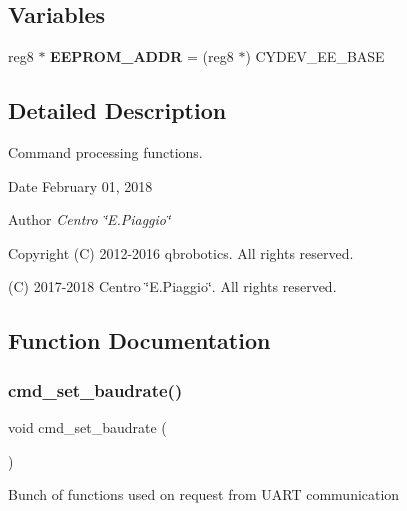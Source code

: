 \subsection*{Variables}
\begin{DoxyCompactItemize}
\item 
\mbox{\label{command__processing_8c_aba5b9353e6d38cc61eb2bd363df61248}} 
reg8 $\ast$ {\bfseries E\+E\+P\+R\+O\+M\+\_\+\+A\+D\+DR} = (reg8 $\ast$) C\+Y\+D\+E\+V\+\_\+\+E\+E\+\_\+\+B\+A\+SE
\end{DoxyCompactItemize}


\subsection{Detailed Description}
Command processing functions. 

\begin{DoxyDate}{Date}
February 01, 2018 
\end{DoxyDate}
\begin{DoxyAuthor}{Author}
{\itshape Centro \char`\"{}\+E.\+Piaggio\char`\"{}} 
\end{DoxyAuthor}
\begin{DoxyCopyright}{Copyright}
(C) 2012-\/2016 qbrobotics. All rights reserved. 

(C) 2017-\/2018 Centro \char`\"{}\+E.\+Piaggio\char`\"{}. All rights reserved. 
\end{DoxyCopyright}


\subsection{Function Documentation}
\mbox{\label{command__processing_8c_aa86bf1f2fa69ab5927f7e4e40eb40581}} 
\subsubsection{cmd\+\_\+set\+\_\+baudrate()}
{\footnotesize\ttfamily void cmd\+\_\+set\+\_\+baudrate (\begin{DoxyParamCaption}{ }\end{DoxyParamCaption})}

Bunch of functions used on request from U\+A\+RT communication \mbox{\label{command__processing_8c_afe52941f8bc21271e811fb0d9f265f38}} 
